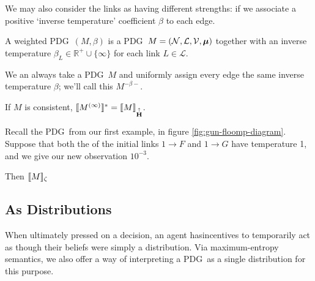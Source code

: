 \documentclass{article}
\newcommand\MaxEnt{{\overset{\uparrow}{\mathbf H}}}
\newcommand\bmu{\boldsymbol{\mu}}
\newcommand{\MN}{PDG}
\begin{document}
	We may also consider the links as having different strengths: if we associate a positive `inverse temperature' coefficient $\beta$ to each edge.
	
	\begin{defn}
		A weighted \MN\ $(M, \beta)$ is a \MN\ $M = (\cal N, L, V, \bmu)$ together with an inverse temperature $\beta_L \in \mathbb R^+ \cup \{\infty\}$ for each link $L \in \mathcal L$.
	\end{defn}

	We an always take a \MN\ $M$ and uniformly assign every edge the same inverse temperature $\beta$; we'll call this $M^{-\beta-}$.
	
	\begin{prop}
		If $M$ is consistent, $\bbr{M^{(\infty)}}^* = \bbr{M}_\MaxEnt$.
	\end{prop}


	\begin{example}[continues=ex:guns-and-floomps]
		Recall the \MN\ from our first example, in figure \ref{fig:gun-floomp-diagram}. Suppose that both the of the initial links $1 \to F$ and $1\to G$ have temperature 1, and we give our new observation $10^{-3}$.
		
		Then $\llbracket M\rrbracket_\zeta$
		\todo{}
	\end{example}	
	
	
	
	
	\subsection{As Distributions}
	
	
	When ultimately pressed on a decision, an agent hasincentives to temporarily act as though their beliefs were simply a distribution. Via maximum-entropy semantics, we also offer a way of interpreting a \MN\ as a single distribution for this purpose. 
	
\end{document}
